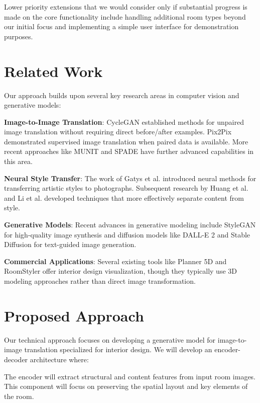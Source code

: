 \documentclass[twocolumn,superscriptaddress,aps]{revtex4-1}
\begin{document}
Lower priority extensions that we would consider only if substantial progress is made on the core functionality include handling additional room types beyond our initial focus and implementing a simple user interface for demonstration purposes.

\section{Related Work}

Our approach builds upon several key research areas in computer vision and generative models:

\textbf{Image-to-Image Translation}: CycleGAN \cite{zhu_unpaired_2020} established methods for unpaired image translation without requiring direct before/after examples. Pix2Pix \cite{isola_image--image_2017} demonstrated supervised image translation when paired data is available. More recent approaches like MUNIT \cite{huang_multimodal_2018} and SPADE \cite{park_semantic_2019} have further advanced capabilities in this area.

\textbf{Neural Style Transfer}: The work of Gatys et al. \cite{gatys_image_2016} introduced neural methods for transferring artistic styles to photographs. Subsequent research by Huang et al. \cite{huang_arbitrary_2017} and Li et al. \cite{li_universal_2017} developed techniques that more effectively separate content from style.

\textbf{Generative Models}: Recent advances in generative modeling include StyleGAN \cite{karras_style-based_2019} for high-quality image synthesis and diffusion models like DALL-E 2 \cite{ramesh_hierarchical_2022} and Stable Diffusion \cite{rombach_high-resolution_2022} for text-guided image generation.

\textbf{Commercial Applications}: Several existing tools like Planner 5D and RoomStyler offer interior design visualization, though they typically use 3D modeling approaches rather than direct image transformation.

\section{Proposed Approach}

Our technical approach focuses on developing a generative model for image-to-image translation specialized for interior design. We will develop an encoder-decoder architecture where:

The encoder will extract structural and content features from input room images. This component will focus on preserving the spatial layout and key elements of the room.
\end{document}
